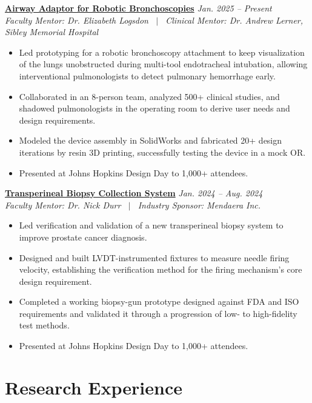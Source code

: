 \documentclass[10.5pt,letterpaper]{article}
\newcommand{\projhead}[2]{%
  \noindent\textbf{#1} \hfill \textit{#2}\\[-0.15em]
}
\begin{document}
\projhead{\href{https://github.com/Devashree1701/eportfolio/blob/master/cv/posters/Airway_Adaptor_Poster.png}{Airway Adaptor for Robotic Bronchoscopies}}{Jan. 2025 -- Present}
\textit{Faculty Mentor: Dr. Elizabeth Logsdon \ $\vert$ \ Clinical Mentor: Dr. Andrew Lerner, Sibley Memorial Hospital}\\[-0.15em]
\begin{itemize}
  \item Led prototyping for a robotic bronchoscopy attachment to keep visualization of the lungs unobstructed during multi-tool endotracheal intubation, allowing interventional pulmonologists to detect pulmonary hemorrhage early.
  \item Collaborated in an 8-person team, analyzed 500+ clinical studies, and shadowed pulmonologists in the operating room to derive user needs and design requirements.
  \item Modeled the device assembly in SolidWorks and fabricated 20+ design iterations by resin 3D printing, successfully testing the device in a mock OR.
  \item Presented at Johns Hopkins Design Day to 1{,}000+ attendees.
\end{itemize}

\projhead{\href{https://github.com/Devashree1701/eportfolio/blob/master/cv/posters/Transperineal_Biopsy_Poster.pdf}{Transperineal Biopsy Collection System}}{Jan. 2024 -- Aug. 2024}
\textit{Faculty Mentor: Dr. Nick Durr \ $\vert$ \ Industry Sponsor: Mendaera Inc.}\\[-0.15em]
\begin{itemize}
  \item Led verification and validation of a new transperineal biopsy system to improve prostate cancer diagnosis.
  \item Designed and built LVDT-instrumented fixtures to measure needle firing velocity, establishing the verification method for the firing mechanism's core design requirement.
  \item Completed a working biopsy-gun prototype designed against FDA and ISO requirements and validated it through a progression of low- to high-fidelity test methods.
  \item Presented at Johns Hopkins Design Day to 1{,}000+ attendees.
\end{itemize}

\section{Research Experience}
\end{document}
